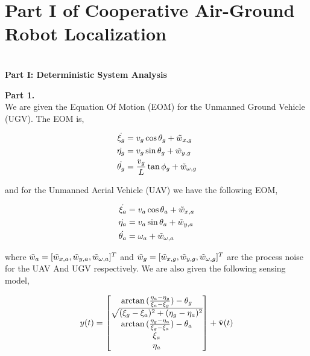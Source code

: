 \documentclass[paper=a4, fontsize=11pt]{scrartcl} %
\numberwithin{equation}{section} %
\numberwithin{figure}{section} %
\numberwithin{table}{section} %
\begin{document}
\section{Part I of Cooperative Air-Ground Robot Localization}
\textbf{\\ Part I: Deterministic System Analysis }
\begin{framed}
\textbf{Part 1.} \\

We are given the Equation Of Motion (EOM) for the Unmanned Ground Vehicle (UGV).  The EOM is,

\begin{align*}
    \dot{\xi_g} &= v_g \cos{\theta_g} + \Tilde{w}_{x,g} \\
    \dot{\eta_g} &= v_g \sin{\theta_g} + \Tilde{w}_{y,g} \\
    \dot{\theta_g} &= \frac{v_g}{L}\tan{\phi_g}  + \Tilde{w}_{\omega,g} \\
\end{align*}

and for the Unmanned Aerial Vehicle (UAV) we have the following EOM,

\begin{align*}
    \dot{\xi_a} &= v_a \cos{\theta_a} + \Tilde{w}_{x,a} \\
    \dot{\eta_a} &= v_a \sin{\theta_a} + \Tilde{w}_{y,a} \\
    \dot{\theta_a} &= \omega_a  + \Tilde{w}_{\omega,a} \\
\end{align*}

where $\Tilde{w}_a = [ \Tilde{w}_{x,a},  \Tilde{w}_{y,a},  \Tilde{w}_{\omega,a}]^T$ and $\Tilde{w}_g = [ \Tilde{w}_{x,g},  \Tilde{w}_{y,g},  \Tilde{w}_{\omega,g}]^T$ are the process noise for the UAV And UGV respectively.  We are also given the following sensing model,

\begin{align*}
y(t) &=  
\begin{bmatrix} \arctan{(\frac{\eta_a - \eta_g}{\xi_a - \xi_g}}) - \theta_g   \\ 
                \sqrt{  (\xi_g - \xi_a)^2 + (\eta_g - \eta_a)^2}  \\
                \arctan{(\frac{\eta_g - \eta_a}{\xi_g - \xi_a})} - \theta_a \\
                \xi_a \\
                \eta_a
\end{bmatrix}  + \Tilde{\bold{v}}(t) \\
\end{align*}


\end{framed}
\end{document}
